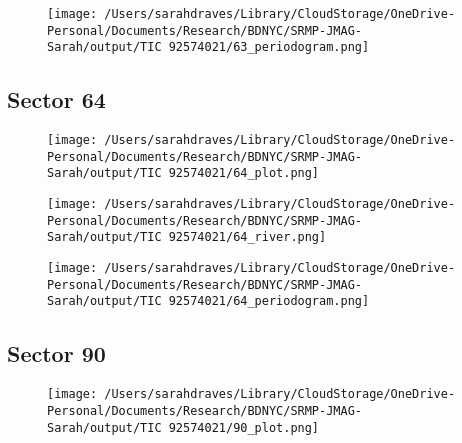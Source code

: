 \documentclass{report}%
\begin{document}
%


\begin{figure}[H]%
\begin{center}%
\centering%
\texttt{[image: /Users/sarahdraves/Library/CloudStorage/OneDrive-Personal/Documents/Research/BDNYC/SRMP-JMAG-Sarah/output/TIC 92574021/63\_periodogram.png]}%
\end{center}%
\end{figure}

%
\newpage%
\subsection{Sector 64}%
\label{subsec:TIC9257402164}%


\begin{figure}[H]%
\begin{center}%
\centering%
\texttt{[image: /Users/sarahdraves/Library/CloudStorage/OneDrive-Personal/Documents/Research/BDNYC/SRMP-JMAG-Sarah/output/TIC 92574021/64\_plot.png]}%
\end{center}%
\end{figure}

%


\begin{figure}[H]%
\begin{center}%
\centering%
\texttt{[image: /Users/sarahdraves/Library/CloudStorage/OneDrive-Personal/Documents/Research/BDNYC/SRMP-JMAG-Sarah/output/TIC 92574021/64\_river.png]}%
\end{center}%
\end{figure}

%


\begin{figure}[H]%
\begin{center}%
\centering%
\texttt{[image: /Users/sarahdraves/Library/CloudStorage/OneDrive-Personal/Documents/Research/BDNYC/SRMP-JMAG-Sarah/output/TIC 92574021/64\_periodogram.png]}%
\end{center}%
\end{figure}

%
\newpage%
\subsection{Sector 90}%
\label{subsec:TIC9257402190}%


\begin{figure}[H]%
\begin{center}%
\centering%
\texttt{[image: /Users/sarahdraves/Library/CloudStorage/OneDrive-Personal/Documents/Research/BDNYC/SRMP-JMAG-Sarah/output/TIC 92574021/90\_plot.png]}%
\end{center}%
\end{figure}
\end{document}
